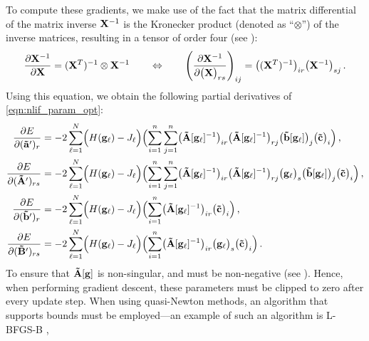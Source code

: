 To compute these gradients, we make use of the fact that the matrix differential of the matrix inverse $\mathbf{X}^{-1}$ is the Kronecker product (denoted as \enquote{$\otimes$}) of the inverse matrices, resulting in a tensor of order four (see \cite[Section~10.6, eq.~1, p.~198]{lutkepohl1997handbook}):
\begin{align}
	\frac{\partial \mathbf{X}^{-1}}{\partial \mathbf{X}}
		= (\mathbf{X}^T)^{-1} \otimes \mathbf{X}^{-1}
	\quad \quad \Leftrightarrow \quad \quad
	\left( \frac{\partial \mathbf{X}^{-1}}{\partial \bigl(\mathbf{X}\bigr)_{rs}} \right)_{ij} =
		\bigl((\mathbf{X}^T)^{-1}\bigr)_{ir} \bigl(\mathbf{X}^{-1}\bigr)_{sj} \,.
	\label{eqn:inverse_differential_tensor}
\end{align}
Using this equation, we obtain the following partial derivatives of \cref{eqn:nlif_param_opt}:%
\begin{align}
	\frac{\partial E}{\partial (\vrap)_{r}} &=
	-2 \sum_{\ell = 1}^N
	\Bigl(H(\vec g_\ell) - J_\ell \Bigr)
   	\Bigl(
   	\sum_{i = 1}^n \sum_{j = 1}^n \bigl( \mrA[\vec g_\ell]^{-1} \bigr)_{ir} \bigl( \mrA[\vec g_\ell]^{-1} \bigr)_{r j} \bigl( \vrb[\vec g_\ell] \bigr)_j \bigl(\vrc\bigr)_i
   	\Bigr) \label{eqn:nlif_parm_grad_a} \,,\\%
%
	\frac{\partial E}{\partial (\mrAp)_{rs}} &=
	-2 \sum_{\ell = 1}^N
	\Bigl(H(\vec g_\ell) - J_\ell \Bigr)
   	\Bigl(
   	\sum_{i = 1}^n \sum_{j = 1}^n \bigl( \mrA[\vec g_\ell]^{-1} \bigr)_{i r} \bigl( \mrA[\vec g_\ell]^{-1} \bigr)_{r j}  \bigl(\vec g_\ell\bigr)_s \bigl( \vrb[\vec g_\ell] \bigr)_j \bigl(\vrc\bigr)_i
   	\Bigr) \label{eqn:nlif_parm_grad_A} \,, \\%
%
	\frac{\partial E}{\partial (\vrbp)_{r}} &=
	-2 \sum_{\ell = 1}^N
	\Bigl(H(\vec g_\ell) - J_\ell \Bigr)
   	\Bigl(
   	\sum_{i=1}^n 
   	 \bigl( \mrA[\vec g_\ell]^{-1} \bigr)_{ir} \bigl(\vrc\bigr)_i
   	\Bigr) \label{eqn:nlif_parm_grad_b} \,, \\%
%
	\frac{\partial E}{\partial (\mrBp)_{rs}} &=
	-2 \sum_{\ell = 1}^N
	\Bigl(H(\vec g_\ell) - J_\ell \Bigr)
   	\Bigl(
   	\sum_{i=1}^n 
   	 \bigl( \mrA[\vec g_\ell]^{-1} \bigr)_{ir} \bigl( \vec g_\ell \bigr)_s \bigl(\vrc\bigr)_i
   	\Bigr) \label{eqn:nlif_parm_grad_B}\,.
\end{align}
To ensure that $\mathbf{\tilde A}[\mathbf{g}]$ is non-singular, \vrap and \mrAp must be non-negative (see ).
Hence, when performing gradient descent, these parameters must be clipped to zero after every update step.
When using quasi-Newton methods, an algorithm that supports bounds must be employed---an example of such an algorithm is L-BFGS-B \citep{byrd1995limited},

